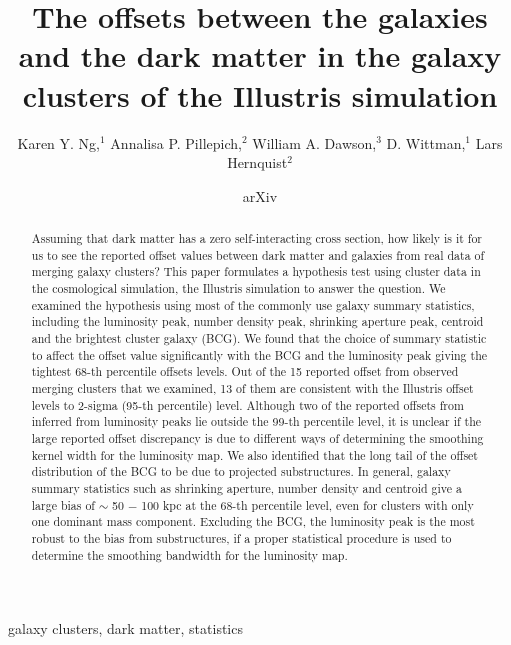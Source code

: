 \documentclass[usenatbib]{mn2e}
\title[
	The offsets between the galaxies and the dark matter in the galaxy clusters of the Illustris simulation]
{The offsets between the galaxies and the dark matter	in the galaxy clusters of
the Illustris simulation}
\author[Karen Y. Ng et al.]{Karen Y. Ng,$^{1}$
	Annalisa P. Pillepich,$^{2}$ 
	William A. Dawson,$^{3}$ 
	D. Wittman,$^{1}$
	\newauthor Lars Hernquist$^{2}$
}
\begin{document}
\date{arXiv} \pagerange{\pageref{firstpage}--\pageref{lastpage}}
 \maketitle\label{firstpage}
\begin{abstract} 
	Assuming that dark matter has a zero self-interacting cross section, how likely is
	it for us to see the reported offset values between dark matter and galaxies 
	from real data of merging galaxy clusters? 
	This paper formulates a hypothesis test using cluster data in the cosmological 
	simulation, the Illustris simulation to answer the question. 
	We examined the hypothesis using most of the commonly use galaxy summary 
	statistics, including the
	luminosity peak, number density peak, shrinking aperture peak, centroid and
	the brightest cluster galaxy (BCG). 	
	We found that the choice of summary statistic to affect the offset
	value significantly with the BCG and the luminosity peak giving the tightest
	68-th percentile offsets levels.  
	Out of the 15 reported offset from observed merging clusters
	that we examined, 13 of
	them are consistent with the Illustris offset levels to 2-sigma 
	(95-th percentile) level. Although two of the reported offsets from inferred
	from luminosity peaks lie outside the 99-th percentile level, it is unclear
	if the large reported offset discrepancy is due to different ways of
	determining the smoothing kernel width for the luminosity map. 
	We also identified that the long
	tail of the offset distribution of the BCG to be due to projected 
	substructures. In general, galaxy summary statistics such as
	shrinking aperture, number density and centroid give a large bias of $\sim$ 50
	$-$ 100 kpc at
	the 68-th percentile level, even for clusters with only one dominant 
	mass component. Excluding the BCG, 
	the luminosity peak is the most 
	robust to the bias from substructures, 
	if a proper statistical procedure is used to determine
	the smoothing bandwidth for the luminosity map.
\end{abstract}

\begin{keywords}
	galaxy clusters, dark matter, statistics 
\end{keywords}





\appendix


\clearpage\bsp\label{lastpage} 
\end{document}
